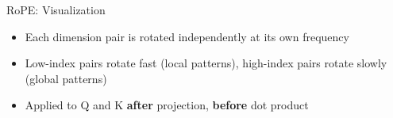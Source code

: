 \begin{frame}{RoPE: Visualization}
\begin{center}
  \end{center}

  \vspace{-0.5em}
  \begin{itemize}
    \item Each dimension pair is rotated independently at its own frequency
    \item Low-index pairs rotate fast (local patterns), high-index pairs rotate slowly (global patterns)
    \item Applied to Q and K \textbf{after} projection, \textbf{before} dot product
  \end{itemize}

\end{frame}

